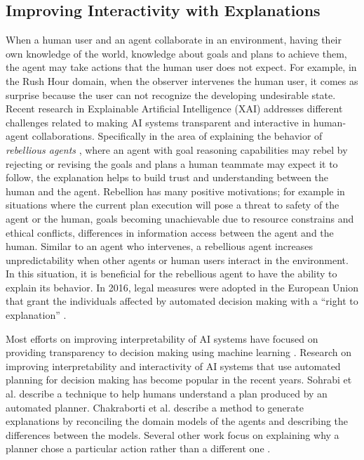 \subsection{Improving Interactivity with Explanations}
When a human user and an agent collaborate in an environment, having their own knowledge of the world, knowledge about goals and plans to achieve them, the agent may take actions that the human user does not expect. 
For example, in the Rush Hour domain, when the observer intervenes the human user, it comes as  surprise because the user can not recognize the developing undesirable state.
Recent research in Explainable Artificial Intelligence (XAI) addresses different challenges related to making AI systems transparent and interactive in human-agent collaborations. Specifically in the area of explaining the behavior of \textit{rebellious agents} \cite{coman2015case}, where an agent with goal reasoning capabilities may rebel by rejecting or revising the goals and plans a human teammate may expect it to follow, the explanation helps to build trust and understanding between the human and the agent. 
Rebellion has many positive motivations; for example in situations where the current plan execution will pose a threat to safety of the agent or the human, goals becoming unachievable due to resource constrains and ethical conflicts, differences in information access between the agent and the human.
Similar to an agent who intervenes, a rebellious agent increases unpredictability when other agents or human users interact in the environment.
In this situation, it is beneficial for the rebellious agent to have the ability to explain its behavior.
In 2016, legal measures were adopted in the European Union that grant the individuals affected by automated decision making with a ``right to explanation'' \cite{eu2016}.

Most efforts on improving interpretability of AI systems have focused on providing transparency to decision making using machine learning \cite{ribeiro2016, lundberg2017, slack2020}. 
Research on improving interpretability and interactivity of AI systems that use automated planning for decision making has become popular in the recent years. Sohrabi et al. \citeyear{sohrabi2011} describe a technique to help humans understand a plan produced by an automated planner. Chakraborti et al. \citeyear{chakraborti2019} describe a method to generate explanations by reconciling the domain models of the agents and describing the differences between the models. 
Several other work focus on explaining why a planner chose a particular action rather than a different one
\cite{langley2017explainable, fox2017xai}.

